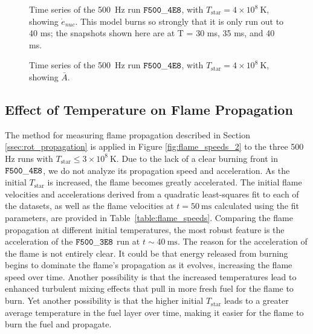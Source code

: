 \documentclass[preprint,times,tighten]{aastex63}
\begin{document}
\begin{figure}[t]
	\centering
	\caption{\label{fig:4e8_stacked_enuc} Time series of the 500~Hz run $\tt{F500\_4E8}$, with $T_{\mathrm{star}} = 4 \times 10^8~\mathrm{K}$, showing $\dot{e}_{nuc}$. This model burns so strongly that it is only run out to 40 ms; the snapshots shown here are at T = 30 ms, 35 ms, and 40 ms.}
\end{figure}

\begin{figure}[t]
	\centering
	\caption{\label{fig:4e8_stacked_abar} Time series of the 500~Hz run $\tt{F500\_4E8}$, with $T_{\mathrm{star}} = 4 \times 10^8~\mathrm{K}$, showing $\bar{A}$.}
\end{figure}


\subsection{Effect of Temperature on Flame Propagation}\label{ssec:temp_prop}

The method for measuring flame propagation described in Section \ref{ssec:rot_propagation} is applied in Figure \ref{fig:flame_speeds_2} to the three 500 Hz runs with $T_{\mathrm{star}} \leq 3 \times 10^8~\mathrm{K}$. Due to the lack of a clear burning front in $\tt{F500\_4E8}$, we do not analyze its propagation speed and acceleration. As the initial $T_{\mathrm{star}}$ is increased, the flame becomes greatly accelerated. The initial flame velocities and accelerations derived from a quadratic least-squares fit to each of the datasets, {\color{blue} as well as the flame velocities at $t = 50~\mathrm{ms}$ calculated using the fit parameters,} are provided in Table~\ref{table:flame_speeds}. {\color{blue} Comparing the flame propagation at different initial temperatures, the most robust feature is the acceleration of the $\tt{F500\_3E8}$ run at $t \sim 40~\mathrm{ms}$.} The reason for the acceleration of the flame is not entirely clear. It could be that energy released from burning begins to dominate the flame's propagation as it evolves, increasing the flame speed over time. Another possibility is that the increased temperatures lead to enhanced turbulent mixing effects that pull in more fresh fuel for the flame to burn. Yet another possibility is that the higher initial $T_{\mathrm{star}}$ leads to a greater average temperature in the fuel layer over time, making it easier for the flame to burn the fuel and propagate.
\end{document}

